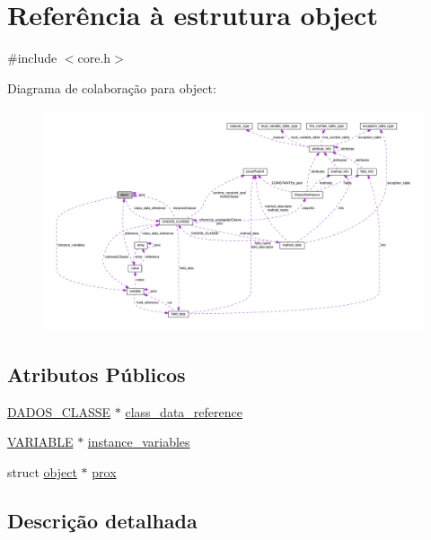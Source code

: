 \hypertarget{structobject}{\section{Referência à estrutura object}
\label{structobject}
}


{\ttfamily \#include $<$core.\-h$>$}



Diagrama de colaboração para object\-:\nopagebreak
\begin{figure}[H]
\begin{center}
\leavevmode
\includegraphics[width=350pt]{structobject__coll__graph}
\end{center}
\end{figure}
\subsection*{Atributos Públicos}
\begin{DoxyCompactItemize}
\item 
\hyperlink{struct_d_a_d_o_s___c_l_a_s_s_e}{D\-A\-D\-O\-S\-\_\-\-C\-L\-A\-S\-S\-E} $\ast$ \hyperlink{structobject_af7136e313255a7d1efdcf775c9f6c412}{class\-\_\-data\-\_\-reference}
\item 
\hyperlink{core_8h_a85b40991452ad00efae1784148c94402}{V\-A\-R\-I\-A\-B\-L\-E} $\ast$ \hyperlink{structobject_ad02cb265ba006796debd79c5e22902d3}{instance\-\_\-variables}
\item 
struct \hyperlink{structobject}{object} $\ast$ \hyperlink{structobject_adc7a300d54dbdc7f5a72f145b30ff3da}{prox}
\end{DoxyCompactItemize}


\subsection{Descrição detalhada}


